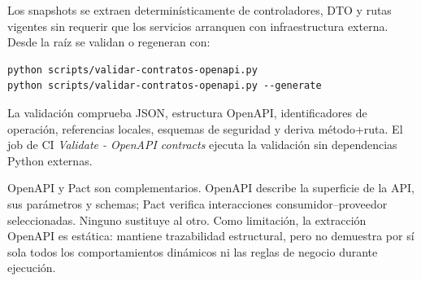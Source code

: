 Los snapshots se extraen determinísticamente de controladores, DTO y rutas
vigentes sin requerir que los servicios arranquen con infraestructura externa.
Desde la raíz se validan o regeneran con:

\begin{lstlisting}
python scripts/validar-contratos-openapi.py
python scripts/validar-contratos-openapi.py --generate
\end{lstlisting}

La validación comprueba JSON, estructura OpenAPI, identificadores de operación,
referencias locales, esquemas de seguridad y deriva método+ruta. El job de CI
\emph{Validate - OpenAPI contracts} ejecuta la validación sin dependencias
Python externas.

OpenAPI y Pact son complementarios. OpenAPI describe la superficie de la API,
sus parámetros y schemas; Pact verifica interacciones consumidor--proveedor
seleccionadas. Ninguno sustituye al otro. Como limitación, la extracción OpenAPI
es estática: mantiene trazabilidad estructural, pero no demuestra por sí sola
todos los comportamientos dinámicos ni las reglas de negocio durante ejecución.
